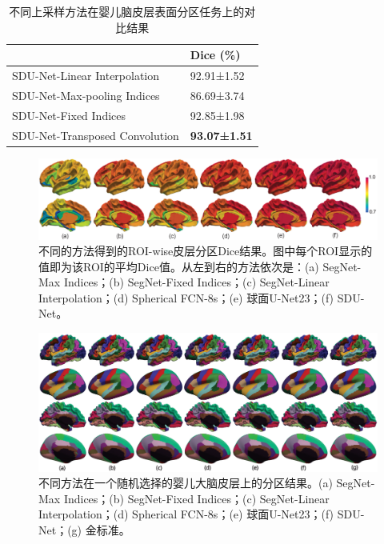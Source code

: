 \begin{table}[t]
		\caption{不同上采样方法在婴儿脑皮层表面分区任务上的对比结果}
		\label{tab:上采样方法比较}
		\centering
		\begin{tabularx}{0.75\linewidth}{X<{\centering} | X<{\centering}}
			\hline
			& Dice (\%)        \\
			\hline		  
			SDU-Net-Linear Interpolation     &     92.91±1.52   \\
			SDU-Net-Max-pooling Indices      &     86.69±3.74   \\
			SDU-Net-Fixed Indices            &     92.85±1.98    \\
			SDU-Net-Transposed Convolution   &	   \textbf{93.07±1.51}  \\
			\hline					 
		\end{tabularx}
\end{table}

\begin{figure}[t]
	\centering
	\includegraphics[width=\linewidth]{figure/figure_roi_result.eps}
	\caption{不同的方法得到的ROI-wise皮层分区Dice结果。图中每个ROI显示的值即为该ROI的平均Dice值。从左到右的方法依次是：(a) SegNet-Max Indices；(b) SegNet-Fixed Indices；(c) SegNet-Linear Interpolation；(d) Spherical FCN-8s；(e) 球面U-Net23；(f) SDU-Net。}
	\label{fig:par_results_roiwise}
\end{figure}

\begin{figure}[t]
	\centering
	\includegraphics[width=\linewidth]{figure/figure_parcellation_result.eps}
	\caption{不同方法在一个随机选择的婴儿大脑皮层上的分区结果。(a) SegNet-Max Indices；(b) SegNet-Fixed Indices；(c) SegNet-Linear Interpolation；(d) Spherical FCN-8s；(e) 球面U-Net23；(f) SDU-Net；(g) 金标准。}
	\label{fig:par_results_35}
\end{figure}

